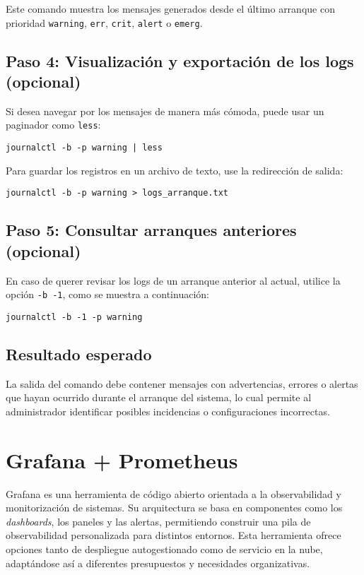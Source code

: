 Este comando muestra los mensajes generados desde el último arranque con prioridad \texttt{warning}, \texttt{err}, \texttt{crit}, \texttt{alert} o \texttt{emerg}.

\subsection*{Paso 4: Visualización y exportación de los logs (opcional)}

Si desea navegar por los mensajes de manera más cómoda, puede usar un paginador como \texttt{less}:

\begin{verbatim}
journalctl -b -p warning | less
\end{verbatim}

Para guardar los registros en un archivo de texto, use la redirección de salida:

\begin{verbatim}
journalctl -b -p warning > logs_arranque.txt
\end{verbatim}

\subsection*{Paso 5: Consultar arranques anteriores (opcional)}

En caso de querer revisar los logs de un arranque anterior al actual, utilice la opción \texttt{-b -1}, como se muestra a continuación:

\begin{verbatim}
journalctl -b -1 -p warning
\end{verbatim}

\subsection*{Resultado esperado}

La salida del comando debe contener mensajes con advertencias, errores o alertas que hayan ocurrido durante el arranque del sistema, lo cual permite al administrador identificar posibles incidencias o configuraciones incorrectas.

\newpage
\section{Grafana + Prometheus}

Grafana es una herramienta de código abierto orientada a la observabilidad y monitorización de sistemas. Su arquitectura se basa en componentes como los \textit{dashboards}, los paneles y las alertas, permitiendo construir una pila de observabilidad personalizada para distintos entornos. Esta herramienta ofrece opciones tanto de despliegue autogestionado como de servicio en la nube, adaptándose así a diferentes presupuestos y necesidades organizativas.

